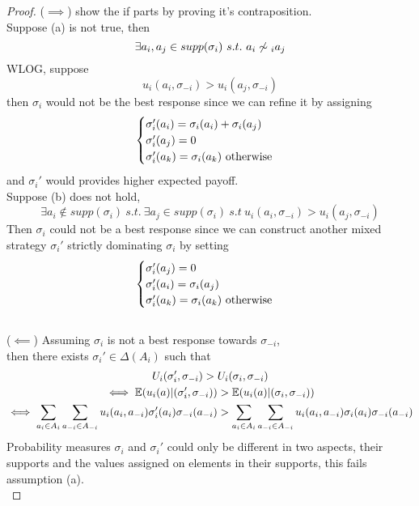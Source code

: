 \documentclass[11pt]{article}
\begin{document}
		\begin{proof}
			($\implies$) show the if parts by proving it's contraposition. \\
			Suppose (a) is not true, then
			\[
				\exists a_i, a_j \in supp(\sigma_i)\ s.t.\ a_i \centernot \sim_i a_j
			\]
			WLOG, suppose
			\[
				u_i(a_i, \sigma_{-i}) > u_i(a_j, \sigma_{-i})
			\]
			then $\sigma_i$ would not be the best response since we can refine it by assigning 
			\[
				\begin{cases}
					\sigma_i' (a_i) = \sigma_i(a_i) + \sigma_i(a_j) \\
					\sigma_i' (a_j) = 0 \\
					\sigma_i' (a_k) = \sigma_i(a_k)\ \text{{otherwise}}
				\end{cases}
			\]
			and $\sigma_i'$ would provides higher expected payoff. \\
			Suppose (b) does not hold, \\
			\[
				\exists a_i \notin supp(\sigma_i)\ s.t.\ \exists a_j \in supp(\sigma_i)\ s.t\ u_i(a_i, \sigma_{-i}) > u_i(a_j, \sigma_{-i})
			\]
			Then $\sigma_i$ could not be a best response since we can construct another mixed strategy $\sigma_i'$ strictly dominating $\sigma_i$ by setting
			\[
				\begin{cases}
					\sigma_i' (a_j) = 0 \\
					\sigma_i' (a_i) = \sigma_i(a_j) \\
					\sigma_i' (a_k) = \sigma_i(a_k)\ \text{{otherwise}}
				\end{cases}
			\] \\
			($\impliedby$) Assuming $\sigma_i$ is not a best response towards $\sigma_{-i}$,\\
			then there exists $\sigma_i' \in \Delta(A_i)$ such that\\
			\begin{gather*}
				U_i(\sigma_i', \sigma_{-i}) > U_i(\sigma_i, \sigma_{-i}) \\
				\iff \mathbb{E}({u_i(a)|(\sigma_i', \sigma_{-i})}) > \mathbb{E}({u_i(a)|(\sigma_i, \sigma_{-i})}) \\
				\iff \sum_{a_i \in A_i} \sum_{a_{-i} \in A_{-i}} u_i(a_i, a_{-i}) \sigma_i'(a_i) \sigma_{-i}(a_{-i}) 
				> \sum_{a_i \in A_i} \sum_{a_{-i} \in A_{-i}} u_i(a_i, a_{-i}) \sigma_i(a_i) \sigma_{-i}(a_{-i})
			\end{gather*}
			Probability measures $\sigma_i$ and $\sigma_i'$ could only be different in two aspects, their supports and the values assigned on elements in their supports, this fails assumption (a). \\

\end{proof}
\end{document}
